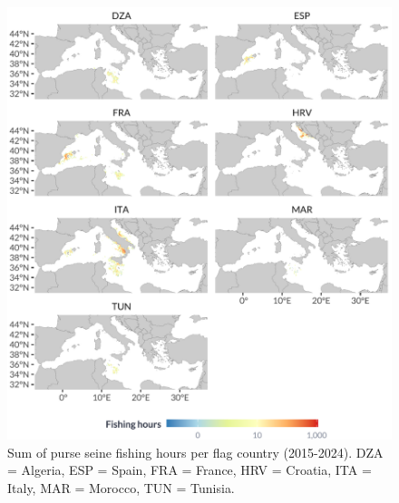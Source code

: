 \begin{figure}[H]
	\centering
	\includegraphics[width=1\linewidth, trim=0 0 0 0,clip]{Figures/plots/seines_countries.pdf}
	\caption{Sum of purse seine fishing hours per flag country (2015-2024). DZA = Algeria, ESP = Spain, FRA = France,
		HRV = Croatia, ITA = Italy, MAR = Morocco, TUN = Tunisia.}
	\label{fig:seine_effort_countries}
\end{figure}

